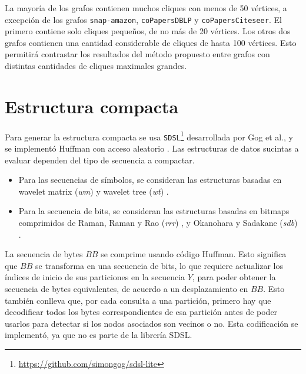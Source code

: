 La mayoría de los grafos contienen muchos cliques con menos de 50 vértices, a excepción de los grafos \texttt{snap-amazon}, \texttt{coPapersDBLP} y \texttt{coPapersCiteseer}. El primero contiene solo cliques pequeños, de no más de 20 vértices. Los otros dos grafos contienen una cantidad considerable de cliques de hasta 100 vértices. Esto permitirá contrastar los resultados del método propuesto entre grafos con distintas cantidades de cliques maximales grandes.



\section{Estructura compacta}

Para generar la estructura compacta se usa \texttt{SDSL}\footnote{\url{https://github.com/simongog/sdsl-lite}} desarrollada por Gog et al.\cite{gbmp2014sea}, y se implementó Huffman con acceso aleatorio \cite{huffman1952method}. Las estructuras de datos sucintas a evaluar dependen del tipo de secuencia a compactar.

\begin{itemize}
	\item Para las secuencias de símbolos, se consideran las estructuras basadas en wavelet matrix (\textit{wm}) \cite{claude2015wavelet} y wavelet tree (\textit{wt}) \cite{grossi2003high}.
	\item Para la secuencia de bits, se consideran las estructuras basadas en bitmaps comprimidos de Raman, Raman y Rao (\textit{rrr}) \cite{raman2002succinct}, y Okanohara y Sadakane (\textit{sdb}) \cite{DBLP:journals/corr/abs-cs-0610001}.
\end{itemize}

La secuencia de bytes $BB$ se comprime usando código Huffman\cite{huffman1952method}. Esto significa que $BB$ se transforma en una secuencia de bits, lo que requiere actualizar los índices de inicio de sus particiones en la secuencia $Y$, para poder obtener la secuencia de bytes equivalentes, de acuerdo a un desplazamiento en $BB$. Esto también conlleva que, por cada consulta a una partición, primero hay que decodificar todos los bytes correspondientes de esa partición antes de poder usarlos para detectar si los nodos asociados son vecinos o no. Esta codificación se implementó, ya que no es parte de la librería SDSL.


